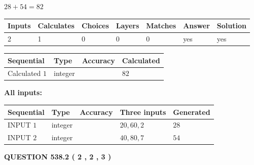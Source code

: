 \documentclass[12pt]{article}
\begin{document}
 

$ %
28 +  %
54=   %
82$
 
 
\noindent{}
 
 

 
   
   
   
   
\noindent\begin{tabular}{|l|l|l|l|l|l|l|}
 \hline
Inputs & Calculates & Choices & Layers & Matches & Answer & Solution \\ \hline
 2  & 
 1  & 
 0
  & 
 0  & 
 0  & 
  yes & 
  yes 
  \\ \hline
 \end{tabular}
   
   
   
   
\noindent{}
   
   
  
  
\noindent\begin{tabular}{|l|l|l|l|}
\hline
 Sequential & Type & Accuracy & Calculated \\ 
\hline
 
 
  Calculated $  1 $ & integer &  & 
  $ 82 $ 
 \\  \hline  
 \end{tabular}
   
   
   
   
\noindent\vspace{0.1in}\hspace{-0.08in} {\textbf{\Large{All inputs: }}}
   
   
  
  
\noindent\begin{tabular}{|l|l|l|l|l|}
\hline
 Sequential & Type & Accuracy & Three inputs & Generated \\ 
\hline
 
 
  INPUT $  1 $ & integer &  & $
 20
 , 
 60
 , 
 2
 $ & $ 28 $ 
 \\  \hline  
 
 
  INPUT $  2 $ & integer &  & $
 40
 , 
 80
 , 
 7
 $ & $ 54 $ 
 \\  \hline  
 \end{tabular}
   
   
  
\vspace{0.2in}
  
{\textbf{\Large{QUESTION
538.2 
 ( 2 , 2 , 3 )
}}}
  
\end{document}
